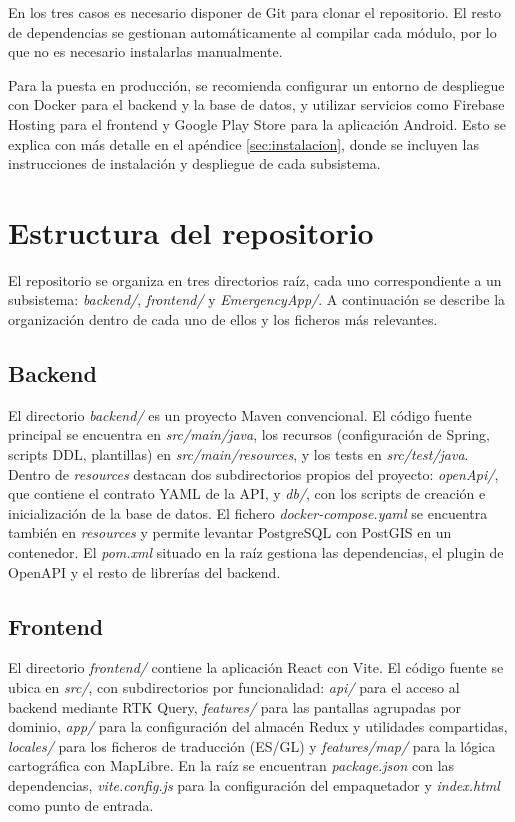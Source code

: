 En los tres casos es necesario disponer de Git para clonar el repositorio. El resto de dependencias se gestionan automáticamente al compilar cada módulo, por lo que no es necesario instalarlas manualmente.

Para la puesta en producción, se recomienda configurar un entorno de despliegue con Docker para el backend y la base de datos, y utilizar servicios como Firebase Hosting para el frontend y Google Play Store para la aplicación Android. Esto se explica con más detalle en el apéndice \ref{sec:instalacion}, donde se incluyen las instrucciones de instalación y despliegue de cada subsistema.

\section{Estructura del repositorio}

El repositorio se organiza en tres directorios raíz, cada uno correspondiente a un subsistema: \textit{backend/}, \textit{frontend/} y \textit{EmergencyApp/}. A continuación se describe la organización dentro de cada uno de ellos y los ficheros más relevantes.

\subsection{Backend}

El directorio \textit{backend/} es un proyecto Maven convencional. El código fuente principal se encuentra en \textit{src/main/java}, los recursos (configuración de Spring, scripts DDL, plantillas) en \textit{src/main/resources}, y los tests en \textit{src/test/java}. Dentro de \textit{resources} destacan dos subdirectorios propios del proyecto: \textit{openApi/}, que contiene el contrato YAML de la API, y \textit{db/}, con los scripts de creación e inicialización de la base de datos. El fichero \textit{docker-compose.yaml} se encuentra también en \textit{resources} y permite levantar PostgreSQL con PostGIS en un contenedor. El \textit{pom.xml} situado en la raíz gestiona las dependencias, el plugin de OpenAPI y el resto de librerías del backend.

\subsection{Frontend}

El directorio \textit{frontend/} contiene la aplicación React con Vite. El código fuente se ubica en \textit{src/}, con subdirectorios por funcionalidad: \textit{api/} para el acceso al backend mediante RTK Query, \textit{features/} para las pantallas agrupadas por dominio, \textit{app/} para la configuración del almacén Redux y utilidades compartidas, \textit{locales/} para los ficheros de traducción (ES/GL) y \textit{features/map/} para la lógica cartográfica con MapLibre. En la raíz se encuentran \textit{package.json} con las dependencias, \textit{vite.config.js} para la configuración del empaquetador y \textit{index.html} como punto de entrada.

